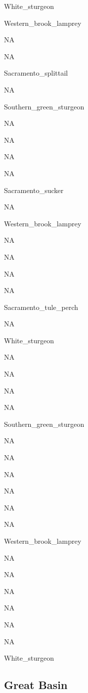\documentclass[]{article}
\newenvironment{Shaded}{\begin{snugshade}}{\end{snugshade}}
\newcommand{\KeywordTok}[1]{\textcolor[rgb]{0.13,0.29,0.53}{\textbf{#1}}}
\newcommand{\StringTok}[1]{\textcolor[rgb]{0.31,0.60,0.02}{#1}}
\newcommand{\CommentTok}[1]{\textcolor[rgb]{0.56,0.35,0.01}{\textit{#1}}}
\newcommand{\OperatorTok}[1]{\textcolor[rgb]{0.81,0.36,0.00}{\textbf{#1}}}
\newcommand{\NormalTok}[1]{#1}
\begin{document}
White\_sturgeon

Western\_brook\_lamprey

NA

NA

Sacramento\_splittail

NA

Southern\_green\_sturgeon

NA

NA

NA

NA

Sacramento\_sucker

NA

Western\_brook\_lamprey

NA

NA

NA

NA

Sacramento\_tule\_perch

NA

White\_sturgeon

NA

NA

NA

NA

Southern\_green\_sturgeon

NA

NA

NA

NA

NA

NA

Western\_brook\_lamprey

NA

NA

NA

NA

NA

NA

White\_sturgeon

\subsection{Great Basin}\label{great-basin}

\begin{Shaded}
\end{Shaded}
\end{document}
